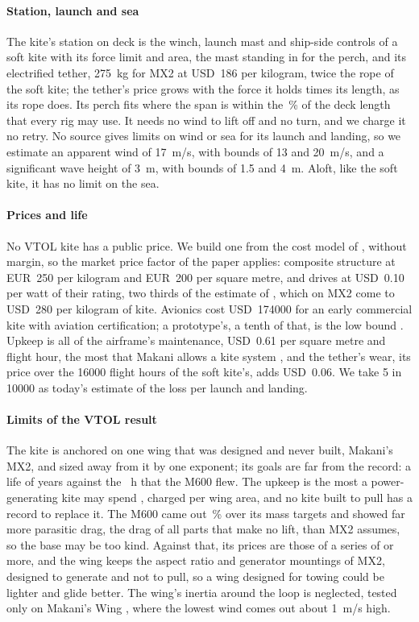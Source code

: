 \paragraph{Station, launch and sea} The kite's station on deck is the winch, launch mast and ship-side controls of a soft kite with its force limit and area, the mast standing in for the perch, and its electrified tether, \SI{275}{kg} for MX2 at USD~186 per kilogram, twice the rope of the soft kite; the tether's price grows with the force it holds times its length, as its rope does. Its perch fits where the span is within the \,\% of the deck length that every rig may use. It needs no wind to lift off and no turn, and we charge it no retry. No source gives limits on wind or sea for its launch and landing, so we estimate an apparent wind of \SI{17}{m/s}, with bounds of 13 and \SI{20}{m/s}, and a significant wave height of \SI{3}{m}, with bounds of 1.5 and \SI{4}{m}. Aloft, like the soft kite, it has no limit on the sea.

\paragraph{Prices and life} No VTOL kite has a public price. We build one from the cost model of \citet{joshi2025}, without margin, so the market price factor of the paper applies: composite structure at EUR~250 per kilogram and EUR~200 per square metre, and drives at USD~0.10 per watt of their rating, two thirds of the estimate of \citet{bauer2018}, which on MX2 come to USD~280 per kilogram of kite. Avionics cost USD~\num{174000} for an early commercial kite with aviation certification; a prototype's, a tenth of that, is the low bound \citep{joshi2025}. Upkeep is all of the airframe's maintenance, USD~0.61 per square metre and flight hour, the most that Makani allows a kite system \citep{echeverri2020part1}, and the tether's wear, its price over the \num{16000} flight hours of the soft kite's, adds USD~0.06. We take 5 in \num{10000} as today's estimate of the loss per launch and landing.

\paragraph{Limits of the VTOL result} The kite is anchored on one wing that was designed and never built, Makani's MX2, and sized away from it by one exponent; its goals are far from the record: a life of  years against the ~h that the M600 flew. The upkeep is the most a power-generating kite may spend \citep{echeverri2020part1}, charged per wing area, and no kite built to pull has a record to replace it. The M600 came out \,\% over its mass targets and showed far more parasitic drag, the drag of all parts that make no lift, than MX2 assumes, so the base may be too kind. Against that, its prices are those of a series of  or more, and the wing keeps the aspect ratio and generator mountings of MX2, designed to generate and not to pull, so a wing designed for towing could be lighter and glide better. The wing's inertia around the loop is neglected, tested only on Makani's  Wing , where the lowest wind comes out about \SI{1}{m/s} high.

